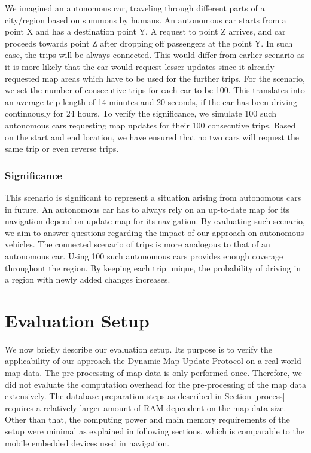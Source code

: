 We imagined an autonomous car, traveling through different parts of a city/region based on summons by humans. An autonomous car starts from a point X and has a destination point Y. A request to point Z arrives, and car proceeds towards point Z after dropping off passengers at the point Y. In such case, the trips will be always connected. This would differ from earlier scenario as it is more likely that the car would request lesser updates since it already requested map areas which have to be used for the further trips. For the scenario, we set the number of consecutive trips for each car to be 100. This translates into an average trip length of 14 minutes and 20 seconds, if the car has been driving continuously for 24 hours. To verify the significance, we simulate 100 such autonomous cars requesting map updates for their 100 consecutive trips. Based on the start and end location, we have ensured that no two cars will request the same trip or even reverse trips. 

\subsubsection{Significance}
This scenario is significant to represent a situation arising from autonomous cars in future. An autonomous car has to always rely on an up-to-date map for its navigation depend on update map for its navigation. By evaluating such scenario, we aim to answer questions regarding the impact of our approach on autonomous vehicles. The connected scenario of trips is more analogous to that of an autonomous car. Using 100 such autonomous cars provides enough coverage throughout the region. By keeping each trip unique, the probability of driving in a region with newly added changes increases. 








 
\section{Evaluation Setup}\label{setup}
We now briefly describe our evaluation setup. Its purpose is to verify the applicability of our approach the Dynamic Map Update Protocol on a real world map data. The pre-processing of map data is only performed once. Therefore, we did not evaluate the computation overhead for the pre-processing of the map data extensively. The database preparation steps as described in Section \ref{process} requires a relatively larger amount of RAM dependent on the map data size. Other than that, the computing power and main memory requirements of the setup were minimal as explained in following sections, which is comparable to the mobile embedded devices used in navigation. 
